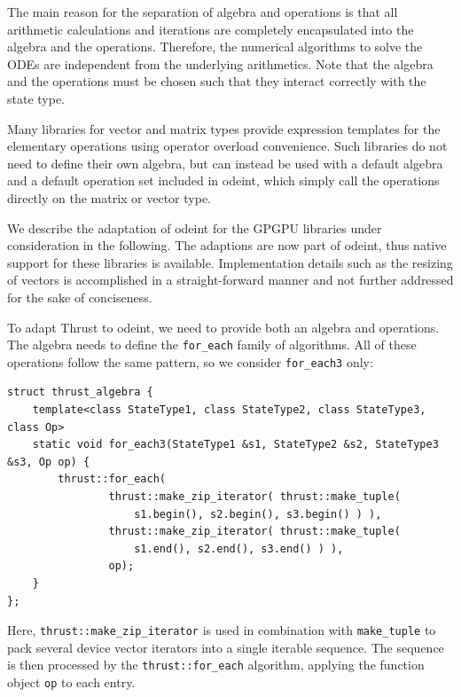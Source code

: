 \documentclass[final]{siamltex}
\newcommand{\code}[1]{\lstinline$#1$}
\begin{document}
The main reason for the separation of algebra and operations is that
all arithmetic calculations and iterations are completely encapsulated
into the algebra and the operations. Therefore, the numerical
algorithms to solve the ODEs are independent from the underlying
arithmetics. Note that the algebra and the operations must be chosen
such that they interact correctly with the state type.

Many libraries for vector and matrix types provide expression templates
\cite{Vandevoorde:CppTemplates,Veldhuizen:ExpressionTemplates, Veldhuizen:Techniques}
for the elementary operations using operator overload
convenience.  Such libraries do not need to define their own algebra, but can
instead be used with a default algebra and a default operation set included in
odeint, which simply call the operations directly on the matrix or vector type.

We describe the adaptation of odeint for the GPGPU libraries under
consideration in the following. The adaptions are now part of odeint, thus
native support for these libraries is available.  Implementation details such as
the resizing of vectors is accomplished in a straight-forward manner and not
further addressed for the sake of conciseness.

To adapt Thrust to odeint, we need to provide both an algebra and
operations. The algebra needs to define the \code{for_each} family of
algorithms. All of these operations follow the same pattern,
so we consider \code{for_each3} only:
\begin{lstlisting}
struct thrust_algebra {
    template<class StateType1, class StateType2, class StateType3, class Op>
    static void for_each3(StateType1 &s1, StateType2 &s2, StateType3 &s3, Op op) {
        thrust::for_each(
                thrust::make_zip_iterator( thrust::make_tuple(
                    s1.begin(), s2.begin(), s3.begin() ) ),
                thrust::make_zip_iterator( thrust::make_tuple(
                    s1.end(), s2.end(), s3.end() ) ),
                op);
    }
};
\end{lstlisting}
Here, \code{thrust::make_zip_iterator} is used in combination with
\code{make_tuple} to pack several device vector iterators into a single
iterable sequence.  The sequence is then processed by the
\code{thrust::for_each} algorithm, applying the function object \code{op} to
each entry.
\end{document}
